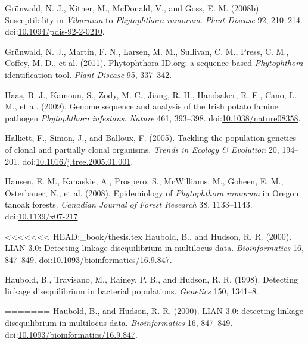 \documentclass[double,12pt]{beavtex}
\begin{document}
  \hypertarget{ref-grunwald2008susceptibility}{}
  Grünwald, N. J., Kitner, M., McDonald, V., and Goss, E. M. (2008b).
  Susceptibility in \emph{Viburnum} to \emph{Phytophthora ramorum}.
  \emph{Plant Disease} 92, 210--214.
  doi:\href{https://doi.org/10.1094/pdis-92-2-0210}{10.1094/pdis-92-2-0210}.
  
  \hypertarget{ref-grunwald2011phytophthora}{}
  Grünwald, N. J., Martin, F. N., Larsen, M. M., Sullivan, C. M., Press,
  C. M., Coffey, M. D., et al. (2011). Phytophthora-ID.org: a
  sequence-based \emph{Phytophthora} identification tool. \emph{Plant
  Disease} 95, 337--342.
  
  \hypertarget{ref-haas2009genome}{}
  Haas, B. J., Kamoun, S., Zody, M. C., Jiang, R. H., Handsaker, R. E.,
  Cano, L. M., et al. (2009). Genome sequence and analysis of the Irish
  potato famine pathogen \emph{Phytophthora infestans}. \emph{Nature} 461,
  393--398.
  doi:\href{https://doi.org/10.1038/nature08358}{10.1038/nature08358}.
  
  \hypertarget{ref-halkett2005tackling}{}
  Halkett, F., Simon, J., and Balloux, F. (2005). Tackling the population
  genetics of clonal and partially clonal organisms. \emph{Trends in
  Ecology \& Evolution} 20, 194--201.
  doi:\href{https://doi.org/10.1016/j.tree.2005.01.001}{10.1016/j.tree.2005.01.001}.
  
  \hypertarget{ref-hansen2008epidemiology}{}
  Hansen, E. M., Kanaskie, A., Prospero, S., McWilliams, M., Goheen, E.
  M., Osterbauer, N., et al. (2008). Epidemiology of \emph{Phytophthora
  ramorum} in Oregon tanoak forests. \emph{Canadian Journal of Forest
  Research} 38, 1133--1143.
  doi:\href{https://doi.org/10.1139/x07-217}{10.1139/x07-217}.
  
<<<<<<< HEAD:_book/thesis.tex
  \hypertarget{ref-haubold2000lian}{}
  Haubold, B., and Hudson, R. R. (2000). LIAN 3.0: Detecting linkage
  disequilibrium in multilocus data. \emph{Bioinformatics} 16, 847--849.
  doi:\href{https://doi.org/10.1093/bioinformatics/16.9.847}{10.1093/bioinformatics/16.9.847}.
  
  \hypertarget{ref-haubold1998detecting}{}
  Haubold, B., Travisano, M., Rainey, P. B., and Hudson, R. R. (1998).
  Detecting linkage disequilibrium in bacterial populations.
  \emph{Genetics} 150, 1341--8.
  
=======
  \hypertarget{ref-Haubold:2000}{}
  Haubold, B., and Hudson, R. R. (2000). LIAN 3.0: detecting linkage
  disequilibrium in multilocus data. \emph{Bioinformatics} 16, 847--849.
  doi:\href{https://doi.org/10.1093/bioinformatics/16.9.847}{10.1093/bioinformatics/16.9.847}.
  
\end{document}
